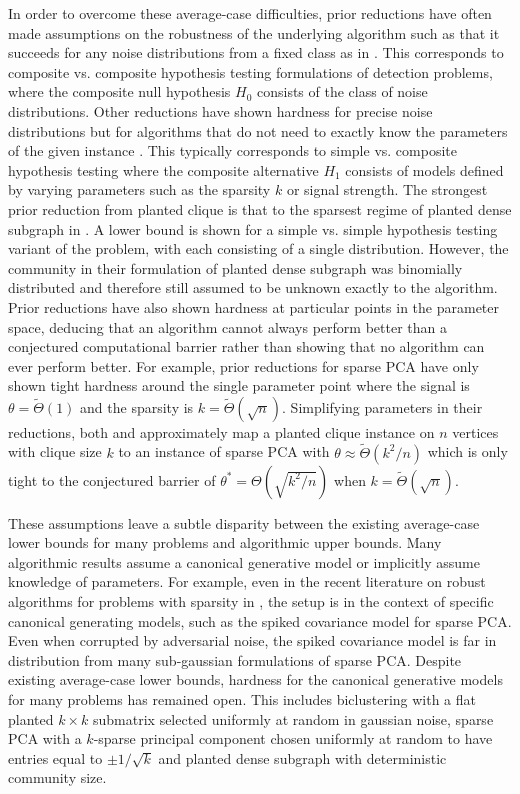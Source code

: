 \documentclass[11pt]{article}
\begin{document}
In order to overcome these average-case difficulties, prior reductions have often made assumptions on the robustness of the underlying algorithm such as that it succeeds for any noise distributions from a fixed class as in \cite{berthet2013complexity, wang2016statistical, cai2015computational}. This corresponds to composite vs. composite hypothesis testing formulations of detection problems, where the composite null hypothesis $H_0$ consists of the class of noise distributions. Other reductions have shown hardness for precise noise distributions but for algorithms that do not need to exactly know the parameters of the given instance \cite{ma2015computational, gao2017sparse}. This typically corresponds to simple vs. composite hypothesis testing where the composite alternative $H_1$ consists of models defined by varying parameters such as the sparsity $k$ or signal strength. The strongest prior reduction from planted clique is that to the sparsest regime of planted dense subgraph in \cite{hajek2015computational}. A lower bound is shown for a simple vs. simple hypothesis testing variant of the problem, with each consisting of a single distribution. However, the community in their formulation of planted dense subgraph was binomially distributed and therefore still assumed to be unknown exactly to the algorithm. Prior reductions have also shown hardness at particular points in the parameter space, deducing that an algorithm cannot always perform better than a conjectured computational barrier rather than showing that no algorithm can ever perform better. For example, prior reductions for sparse PCA have only shown tight hardness around the single parameter point where the signal is $\theta = \tilde{\Theta}(1)$ and the sparsity is $k = \tilde{\Theta}(\sqrt{n})$. Simplifying parameters in their reductions, both \cite{berthet2013complexity} and \cite{gao2017sparse} approximately map a planted clique instance on $n$ vertices with clique size $k$ to an instance of sparse PCA with $\theta \approx \tilde{\Theta}(k^2/n)$ which is only tight to the conjectured barrier of $\theta^* = \Theta(\sqrt{k^2/n})$ when $k = \tilde{\Theta}(\sqrt{n})$.

These assumptions leave a subtle disparity between the existing average-case lower bounds for many problems and algorithmic upper bounds. Many algorithmic results assume a canonical generative model or implicitly assume knowledge of parameters. For example, even in the recent literature on robust algorithms for problems with sparsity in \cite{balakrishnan2017computationally, li2017robust}, the setup is in the context of specific canonical generating models, such as the spiked covariance model for sparse PCA. Even when corrupted by adversarial noise, the spiked covariance model is far in distribution from many sub-gaussian formulations of sparse PCA. Despite existing average-case lower bounds, hardness for the canonical generative models for many problems has remained open. This includes biclustering with a flat planted $k \times k$ submatrix selected uniformly at random in gaussian noise, sparse PCA with a $k$-sparse principal component chosen uniformly at random to have entries equal to $\pm 1/\sqrt{k}$ and planted dense subgraph with deterministic community size.
\end{document}
